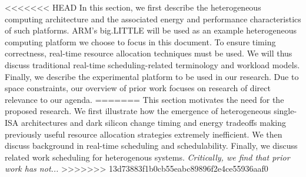 <<<<<<< HEAD
In this section, we first describe the heterogeneous computing architecture and the associated energy and performance characteristics of such platforms. ARM's big.LITTLE will be used as an example heterogeneous computing platform we choose to focus in this document. To ensure timing correctness, real-time resource allocation techniques must be used. We will thus discuss traditional real-time scheduling-related terminology and workload models. Finally, we describe the experimental platform to be used in our research. Due to space constraints, our overview of prior work focuses on research of direct relevance to our agenda.
=======
This section motivates the need for the proposed research.  We first
illustrate how the emergence of heterogeneous single-ISA architectures
and dark silicon change timing and energy tradeoffs making previously
useful resource allocation strategies extremely inefficient.  We then
discuss background in real-time scheduling and schedulability.
Finally, we discuss related work scheduling for heterogenous systems.
\emph{Critically, we find that prior work has not...}
>>>>>>> 13d73883f1b0cb55eabc89896f2e4ce55936aaf0

